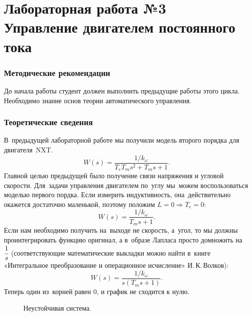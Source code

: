\documentclass[12pt,a4paper,openany]{extarticle}
\begin{document}
\part*{Лабораторная работа №3\\
 Управление двигателем постоянного тока}
\section{Методические рекомендации}
До начала работы студент должен выполнить предыдущие работы этого цикла. Необходимо знание основ теории автоматического управления.
\section{Теоретические сведения}
В~предыдущей лабораторной работе мы получили модель второго порядка для двигателя~NXT. 
\begin{equation}
W(s)=\frac{1/k_\omega}{T_eT_ms^2+T_ms+1}.
\end{equation}
Главной целью предыдущей было получение связи напряжения и угловой скорости. Для~задачи управления двигателем по~углу мы~можем воспользоваться моделью первого пордка. Если измерить индуктивность, она~действительно окажется достаточно маленькой, поэтому положим $L=0\Rightarrow T_e=0$:
\begin{equation}
W(s)=\frac{1/k_\omega}{T_ms+1}.
\end{equation}
Если нам необходимо получить на~выходе не скорость, а~угол, то мы должны проинтегрировать функцию оригинал, а в~образе Лапласа просто домножить на~$\cfrac1s$ (соответствующие математические выкладки можно найти в~книге «Интегральное преобразование и операционное исчисление» И.\,К.\,Волков):
\begin{equation}
W(s)=\frac{1/k_\omega}{s(T_ms+1)}.
\end{equation}
Теперь один из~корней равен 0, и график не сходится к нулю.

\begin{figure}[H]
	\noindent{}
	\caption{Неустойчивая система.}
	\label{fig2}
\end{figure}					
\end{document}
